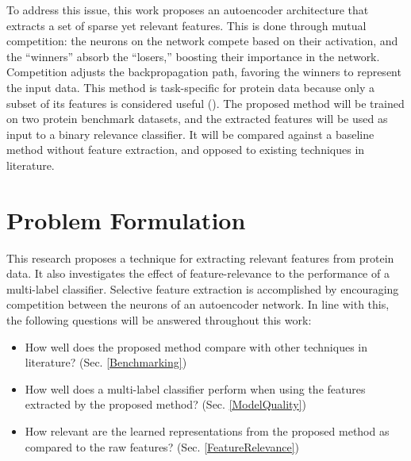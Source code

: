 \par To address this issue, this work proposes an autoencoder architecture that
extracts a set of sparse yet relevant features. This is done through mutual
competition: the neurons on the network compete based on their activation, and
the ``winners'' absorb the ``losers,'' boosting their importance in the network.
Competition adjusts the backpropagation path, favoring the winners to represent
the input data. This method is task-specific for protein data because only a subset
of its features is considered useful (\cite{iqbal2014efficient, gaudet2017gene}).
The proposed method will be trained on two protein benchmark datasets, and the
extracted features will be used as input to a binary relevance classifier. It will
be compared against a baseline method without feature extraction, and opposed to
existing techniques in literature.

\section{Problem Formulation}
\label{Problem}

\par This research proposes a technique for extracting relevant features from
protein data. It also investigates the effect of feature-relevance to the
performance of a multi-label classifier. Selective feature extraction is
accomplished by encouraging competition between the neurons of an
autoencoder network. In line with this, the following questions will be
answered throughout this work:

\begin{itemize}
    \item How well does the proposed method compare with other techniques in
        literature? (Sec. \ref{Benchmarking})
    \item How well does a multi-label classifier perform when using the
        features extracted by the proposed method? (Sec. \ref{ModelQuality})
    \item How relevant are the learned representations from the proposed method
        as compared to the raw features? (Sec. \ref{FeatureRelevance})
\end{itemize}


